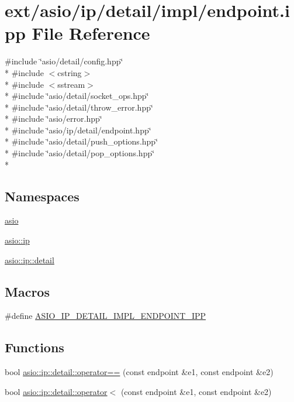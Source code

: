 \hypertarget{ip_2detail_2impl_2endpoint_8ipp}{}\section{ext/asio/ip/detail/impl/endpoint.ipp File Reference}
\label{ip_2detail_2impl_2endpoint_8ipp}
{\ttfamily \#include \char`\"{}asio/detail/config.\+hpp\char`\"{}}\\*
{\ttfamily \#include $<$cstring$>$}\\*
{\ttfamily \#include $<$sstream$>$}\\*
{\ttfamily \#include \char`\"{}asio/detail/socket\+\_\+ops.\+hpp\char`\"{}}\\*
{\ttfamily \#include \char`\"{}asio/detail/throw\+\_\+error.\+hpp\char`\"{}}\\*
{\ttfamily \#include \char`\"{}asio/error.\+hpp\char`\"{}}\\*
{\ttfamily \#include \char`\"{}asio/ip/detail/endpoint.\+hpp\char`\"{}}\\*
{\ttfamily \#include \char`\"{}asio/detail/push\+\_\+options.\+hpp\char`\"{}}\\*
{\ttfamily \#include \char`\"{}asio/detail/pop\+\_\+options.\+hpp\char`\"{}}\\*
\subsection*{Namespaces}
\begin{DoxyCompactItemize}
\item 
 \hyperlink{namespaceasio}{asio}
\item 
 \hyperlink{namespaceasio_1_1ip}{asio\+::ip}
\item 
 \hyperlink{namespaceasio_1_1ip_1_1detail}{asio\+::ip\+::detail}
\end{DoxyCompactItemize}
\subsection*{Macros}
\begin{DoxyCompactItemize}
\item 
\#define \hyperlink{ip_2detail_2impl_2endpoint_8ipp_ab4eec1cb823b43ff7edf54ff56018c50}{A\+S\+I\+O\+\_\+\+I\+P\+\_\+\+D\+E\+T\+A\+I\+L\+\_\+\+I\+M\+P\+L\+\_\+\+E\+N\+D\+P\+O\+I\+N\+T\+\_\+\+I\+P\+P}
\end{DoxyCompactItemize}
\subsection*{Functions}
\begin{DoxyCompactItemize}
\item 
bool \hyperlink{namespaceasio_1_1ip_1_1detail_a7321e9dce2b11307043d36e88e231d29}{asio\+::ip\+::detail\+::operator==} (const endpoint \&e1, const endpoint \&e2)
\item 
bool \hyperlink{namespaceasio_1_1ip_1_1detail_acbdac8d12796c5072bdf3fa7f9fcc279}{asio\+::ip\+::detail\+::operator$<$} (const endpoint \&e1, const endpoint \&e2)
\end{DoxyCompactItemize}


